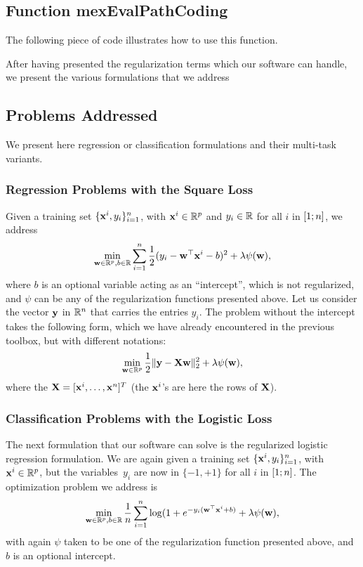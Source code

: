 \documentclass[a4paper, 11pt]{article}
\begin{document}
\subsection{Function mexEvalPathCoding}

The following piece of code illustrates how to use this function.


After having presented the regularization terms which our software can handle,
we present the various formulations that we address
\subsection{Problems Addressed}
We present here regression or classification formulations and their multi-task variants.
\subsubsection{Regression Problems with the Square Loss}  %
Given a training set $\{{\mathbf x}^i,y_i\}_{i=1}^n$, with ${\mathbf x}^i \in {\mathbb R}^p$ and $y_i \in {\mathbb R}$ for all $i$ in $[ 1;n ]$, we address
\begin{displaymath}
\min_{{\mathbf w} \in {\mathbb R}^p, b \in {\mathbb R}} \sum_{i=1}^n \frac{1}{2}(y_i-{\mathbf w}^\top{\mathbf x}^i-b)^2 + \lambda\psi({\mathbf w}),
\end{displaymath}
where $b$ is an optional variable acting as an ``intercept'', which is not regularized, and $\psi$
can be any of the regularization functions presented above.
Let us consider the vector ${\mathbf y}$ in ${\mathbb R}^n$ that carries the entries $y_i$.
The problem without the intercept takes the following form, which we have already
encountered in the previous toolbox, but with different notations:
\begin{displaymath}
\min_{{\mathbf w} \in {\mathbb R}^p} \frac{1}{2}\|{\mathbf y}-{\mathbf X}{\mathbf w}\|_2^2 + \lambda\psi({\mathbf w}),
   \end{displaymath}
   where the ${\mathbf X}=[{\mathbf x}^i,\ldots,{\mathbf x}^n]^T$ (the ${\mathbf x}^i$'s are here the rows of ${\mathbf X}$).
   \subsubsection{Classification Problems with the Logistic Loss}
   The next formulation that our software can solve is the regularized logistic regression formulation.
   We are again given a training set $\{{\mathbf x}^i,y_i\}_{i=1}^n$, with ${\mathbf x}^i \in
   {\mathbb R}^p$, but the variables~$y_i$ are now in $\{-1,+1\}$ for all $i$ in
   $[ 1;n ]$. The optimization problem we address is
   \begin{displaymath}
   \min_{{\mathbf w} \in {\mathbb R}^p, b \in {\mathbb R}} \frac{1}{n}\sum_{i=1}^n \log(1+e^{-y_i({\mathbf w}^\top{\mathbf x}^i+b)} + \lambda\psi({\mathbf w}),
         \end{displaymath}
         with again $\psi$ taken to be one of the regularization function presented above, and $b$ is an optional intercept.
\end{document}
